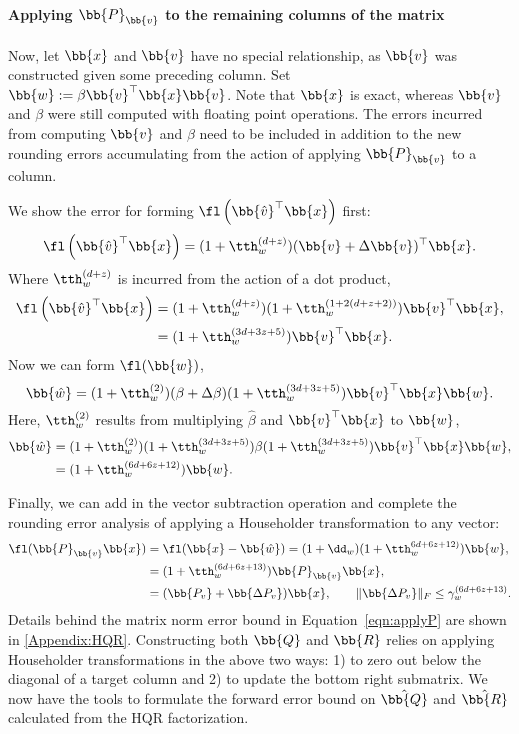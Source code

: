 \paragraph{Applying $\bb{P}_{\bb{v}}$ to the remaining columns of the matrix}
Now, let $\bb{x}$ and $\bb{v}$ have no special relationship, as $\bb{v}$ was constructed given some preceding column.
Set $\bb{w}:= \beta \bb{v}^{\top}\bb{x}\bb{v}$.
Note that $\bb{x}$ is exact, whereas $\bb{v}$ and $\beta$ were still computed with floating point operations. 
The errors incurred from computing $\bb{v}$ and $\beta$ need to be included in addition to the new rounding errors accumulating from the action of applying $\bb{P}_{\bb{v}}$ to a column.

We show the error for forming $\fl\left(\bb{\hat{v}}^{\top}\bb{x}\right)$ first:
\begin{equation*}
\fl\left(\bb{\hat{v}}^{\top}\bb{x}\right) = (1+\tth_w^{(d+z)})(\bb{v}+\Delta\bb{v})^{\top}\bb{x}.
\end{equation*}
Where $\tth_w^{(d+z)}$ is incurred from the action of a dot product,
\begin{align*}
\fl\left(\bb{\hat{v}}^{\top}\bb{x}\right)&= (1+\tth_w^{(d+z)})(1+\tth_w^{(1+2(d+z+2))})\bb{v}^{\top}\bb{x},\\
&= (1+\tth_w^{(3d+3z+5)})\bb{v}^{\top}\bb{x}.
\end{align*}
Now we can form $\fl(\bb{w})$,
\begin{equation*}
\bb{\hat{w}} =(1+\tth_w^{(2)})(\beta+\Delta\beta)(1+\tth_w^{(3d+3z+5)})\bb{v}^{\top}\bb{x}\bb{w}.
\end{equation*}
Here, $\tth_w^{(2)}$ results from multiplying  $\hat{\beta}$ and $\bb{v}^{\top}\bb{x}$ to $\bb{w}$,
\begin{align*}
\bb{\hat{w}} &= (1+\tth_w^{(2)})(1+\tth_w^{(3d+3z+5)})\beta(1+\tth_w^{(3d+3z+5)})\bb{v}^{\top}\bb{x}\bb{w},\\
&= (1+\tth_w^{(6d+6z+12)})\bb{w}.
\end{align*}

Finally, we can add in the vector subtraction operation and complete the rounding error analysis of applying a Householder transformation to any vector:
\begin{align}
\fl(\bb{P}_{\bb{v}}\bb{x}) & = \fl(\bb{x}-\bb{\hat{w}}) = (1+\dd_w)(1+\tth_w^{6d+6z+12)})\bb{w}, \\
&= (1+\tth_w^{(6d+6z+13)})\bb{P}_{\bb{v}}\bb{x},\\
&= (\bb{P_v} +\bb{\Delta P_v})\bb{x},\qquad \|\bb{\Delta P_v}\|_F \leq \gamma_w^{(6d+6z+13)}. \label{eqn:applyP}
\end{align}
Details behind the matrix norm error bound in Equation~\ref{eqn:applyP} are shown in \ref{Appendix:HQR}.
Constructing both $\bb{Q}$ and $\bb{R}$ relies on applying Householder transformations in the above two ways: 1) to zero out below the diagonal of a target column and 2) to update the bottom right submatrix. 
We now have the tools to formulate the forward error bound on $\hat{\bb{Q}}$ and $\hat{\bb{R}}$ calculated from the HQR factorization.

